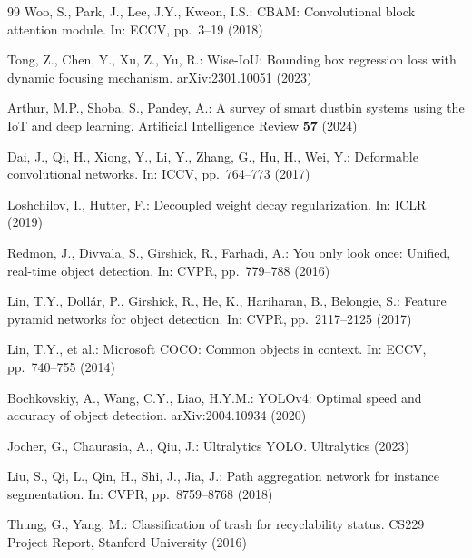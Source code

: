 \documentclass[runningheads]{llncs}
\begin{document}
\begin{thebibliography}{99}
Woo, S., Park, J., Lee, J.Y., Kweon, I.S.:
CBAM: Convolutional block attention module.
In: ECCV, pp.~3--19 (2018)

Tong, Z., Chen, Y., Xu, Z., Yu, R.:
Wise-{IoU}: Bounding box regression loss with dynamic focusing mechanism.
arXiv:2301.10051 (2023)

Arthur, M.P., Shoba, S., Pandey, A.:
A survey of smart dustbin systems using the {IoT} and deep learning.
Artificial Intelligence Review \textbf{57} (2024)

Dai, J., Qi, H., Xiong, Y., Li, Y., Zhang, G., Hu, H., Wei, Y.:
Deformable convolutional networks.
In: ICCV, pp.~764--773 (2017)

Loshchilov, I., Hutter, F.:
Decoupled weight decay regularization.
In: ICLR (2019)

Redmon, J., Divvala, S., Girshick, R., Farhadi, A.:
You only look once: Unified, real-time object detection.
In: CVPR, pp.~779--788 (2016)

Lin, T.Y., Doll\'{a}r, P., Girshick, R., He, K., Hariharan, B., Belongie, S.:
Feature pyramid networks for object detection.
In: CVPR, pp.~2117--2125 (2017)

Lin, T.Y., et al.:
Microsoft {COCO}: Common objects in context.
In: ECCV, pp.~740--755 (2014)

Bochkovskiy, A., Wang, C.Y., Liao, H.Y.M.:
{YOLOv4}: Optimal speed and accuracy of object detection.
arXiv:2004.10934 (2020)

Jocher, G., Chaurasia, A., Qiu, J.:
Ultralytics {YOLO}.
Ultralytics (2023)

Liu, S., Qi, L., Qin, H., Shi, J., Jia, J.:
Path aggregation network for instance segmentation.
In: CVPR, pp.~8759--8768 (2018)

Thung, G., Yang, M.:
Classification of trash for recyclability status.
CS229 Project Report, Stanford University (2016)

\end{thebibliography}
\end{document}
